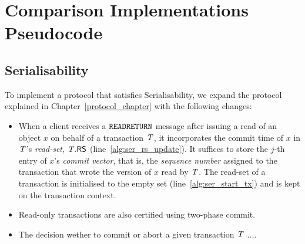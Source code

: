 \cleardoublepage
\chapter{Comparison Implementations Pseudocode}
\label{appendix:code}


\section{Serialisability}
\label{appendix:ser}




To implement a protocol that satisfies Serialisability, we expand the protocol explained in Chapter~\ref{protocol_chapter} with the following changes:

\begin{itemize}
  \item When a client receives a ${\tt READRETURN}$ message after issuing a read of an object $x$ on behalf of a transaction $\mathit{T}$, it incorporates the commit time of $x$ in $\mathit{T}$'s \emph{read-set}, $\mathit{T}.\mathsf{RS}$ (line~\ref{alg:ser_rs_update}). It suffices to store the $j$-th entry of $x$'s \emph{commit vector}, that is, the \emph{sequence number} assigned to the transaction that wrote the version of $x$ read by $\mathit{T}$. The read-set of a transaction is initialised to the empty set (line~\ref{alg:ser_start_tx}) and is kept on the transaction context.
  \item Read-only transactions are also certified using two-phase commit.
  \item The decision wether to commit or abort a given transaction $\mathit{T}$ ....
\end{itemize}

